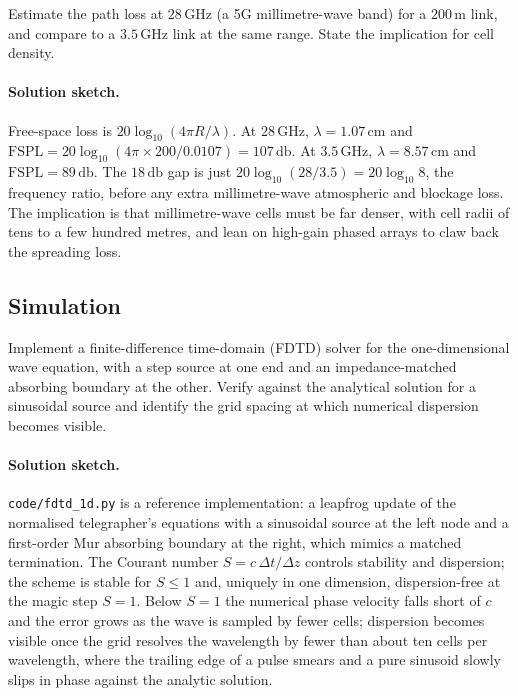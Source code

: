 \begin{exercise}
Estimate the path loss at $28\,\si{\giga\hertz}$ (a 5G millimetre-wave
band) for a $200\,\si{\meter}$ link, and compare to a $3.5\,\si{\giga
\hertz}$ link at the same range. State the implication for cell
density.
\paragraph{Solution sketch.} Free-space loss is $20\log_{10}(4\pi R/
\lambda)$. At $28\,\si{\giga\hertz}$, $\lambda = 1.07\,\si{\centi
\meter}$ and $\text{FSPL} = 20\log_{10}(4\pi\times 200/0.0107) = 107\,
\si{\decibel}$. At $3.5\,\si{\giga\hertz}$, $\lambda = 8.57\,\si{\centi
\meter}$ and $\text{FSPL} = 89\,\si{\decibel}$. The $18\,\si{\decibel}$
gap is just $20\log_{10}(28/3.5) = 20\log_{10}8$, the frequency ratio,
before any extra millimetre-wave atmospheric and blockage loss. The
implication is that millimetre-wave cells must be far denser, with cell
radii of tens to a few hundred metres, and lean on high-gain phased
arrays to claw back the spreading loss.
\end{exercise}

\subsection*{Simulation}

\begin{exercise}
Implement a finite-difference time-domain (FDTD) solver for the
one-dimensional wave equation, with a step source at one end and an
impedance-matched absorbing boundary at the other. Verify against the
analytical solution for a sinusoidal source and identify the grid
spacing at which numerical dispersion becomes visible.
\paragraph{Solution sketch.} \texttt{code/fdtd\_1d.py} is a reference
implementation: a leapfrog update of the normalised telegrapher's
equations with a sinusoidal source at the left node and a first-order
Mur absorbing boundary at the right, which mimics a matched termination.
The Courant number $S = c\,\Delta t/\Delta z$ controls stability and
dispersion; the scheme is stable for $S\le 1$ and, uniquely in one
dimension, dispersion-free at the magic step $S = 1$. Below $S = 1$ the
numerical phase velocity falls short of $c$ and the error grows as the
wave is sampled by fewer cells; dispersion becomes visible once the
grid resolves the wavelength by fewer than about ten cells per
wavelength, where the trailing edge of a pulse smears and a pure sinusoid
slowly slips in phase against the analytic solution.
\end{exercise}

